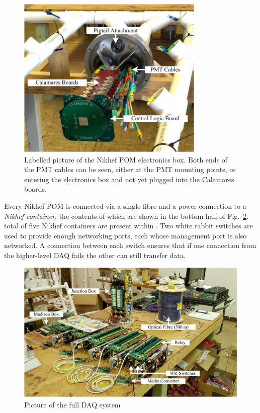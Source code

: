 \begin{figure} %
    \includegraphics[width=0.8\textwidth]{diagrams/5-daq/nikhef_plane.pdf}
    \caption[Labelled picture of the Nikhef POM electronics box.]
    {Labelled picture of the Nikhef POM electronics box. Both ends of the PMT cables can be seen,
        either at the PMT mounting points, or entering the electronics box and not yet plugged
        into the Calamares boards.}
    \label{fig:nikhef_plane}
\end{figure}

Every Nikhef POM is connected via a single fibre and a power connection to a \emph{Nikhef
    container}, the contents of which are shown in the bottom half of Fig.~\ref{fig:full_setup}. total
of five Nikhef containers are present within \chipsfive. Two white rabbit switches are used to
provide enough networking ports, each whose management port is also networked. A connection
between each switch ensures that if one connection from the higher-level DAQ fails the other can
still transfer data.

\begin{figure} %
    \includegraphics[width=\textwidth]{diagrams/5-daq/full_setup.pdf}
    \caption[full set up short]
    {Picture of the full \chipsfive DAQ system}
    \label{fig:full_setup}
\end{figure}

